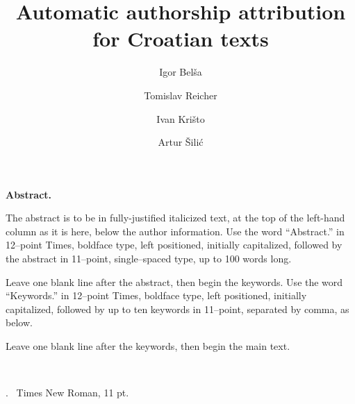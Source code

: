 \documentclass[11pt,english]{article}
\let\LaTeXtitle\title
\renewcommand{\title}[1]{\LaTeXtitle{\Large \textbf{#1}}}
\renewenvironment{abstract}
{\noindent \large \bf Abstract. \normalsize \begin{it}}
{\end{it}\\}
\newenvironment{keywords}
{\noindent {\large {\bf Keywords}}.~}{}
\begin{document}
\title{Automatic authorship attribution for Croatian texts}
\author{Igor Belša}
\author{Tomislav Reicher}
\author{Ivan Krišto}
\author{Artur Šilić}

\date{}

\maketitle

\thispagestyle{empty}
\pagestyle{empty}
\begin{multicols}{2}



\begin{abstract}
The abstract is to be in fully-justified italicized text, at the top of the
left-hand column as it is here, below the author information. Use the word
``Abstract.'' in 12--point Times, boldface type, left positioned, initially
capitalized, followed by the abstract in 11--point, single--spaced type, up to
100 words long.

Leave one blank line after the abstract, then begin the keywords. Use
the word ``Keywords.'' in 12--point Times, boldface type, left positioned,
initially capitalized, followed by up to ten keywords in 11--point, separated
by comma, as below.

Leave one blank line after the keywords, then begin the main text.
\end{abstract}

\begin{keywords}
Times New Roman, 11 pt.
\end{keywords}


\end{multicols}
\end{document}
